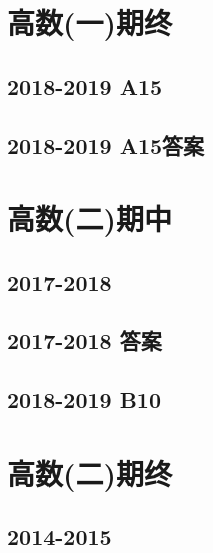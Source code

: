 \documentclass[cn,11pt,fancy,hide]{elegantbook}
\begin{document}
\section{高数(一)期终}
\subsection{2018-2019 A15}
\subsection{2018-2019 A15答案}




\section{高数(二)期中}
\subsection{2017-2018}
\subsection{2017-2018 答案}
\subsection{2018-2019 B10}




\section{高数(二)期终}
\subsection{2014-2015}
\end{document}
